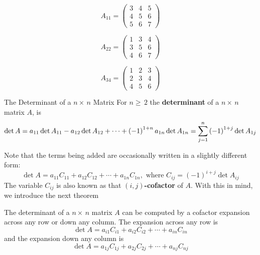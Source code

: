 \begin{minipage}{0.3\linewidth}
    \[
        A_{11} = \begin{pmatrix}
            3 & 4 & 5 \\
            4 & 5 & 6 \\
            5 & 6 & 7
        \end{pmatrix}
    \]    
\end{minipage}
\hfill
\begin{minipage}{0.3\linewidth}
    \[
        A_{22} = \begin{pmatrix}
            1 & 3 & 4 \\
            3 & 5 & 6 \\
            4 & 6 & 7
        \end{pmatrix}
    \]
\end{minipage}
\hfill
\begin{minipage}{0.3\linewidth}
   \[
        A_{34} = \begin{pmatrix}
            1 & 2 & 3 \\
            2 & 3 & 4 \\
            4 & 5 & 6
        \end{pmatrix}
   \] 
\end{minipage}

\begin{defbox}{The Determinant of a $n\times\,n$ Matrix}{}
    For $n\geq\,2$ the \textbf{determinant} of a $n\times\,n$ matrix $A$, is 
    \[\det{A} = a_{11}\det{A_{11}} - a_{12}\det{A_{12}} + \cdots + \left(-1\right)^{1+n}a_{1n}\det{A_{1n}} \\ = \sum_{j=1}^{n} \left(-1\right)^{1+j}\det{A_{1j}}\]
\end{defbox}

Note that the terms being added are occasionally written in a slightly different form: 
\[
    \det{A} = a_{11}C_{11} + a_{12}C_{12} + \cdots + a_{1n}C_{1n}, \text{ where } C_{ij} = \left(-1\right)^{i+j}\det{A_{ij}}
\]
The variable $C_{ij}$ is also known as that \textbf{$(i, j)$-cofactor} of $A$. With this in mind, we introduce the next theorem

\begin{thm}{}{}
    The determinant of a $n\times\,n$ matrix $A$ can be computed by a cofactor expansion across any row or down any column. The expansion across any row is 
    \[\det{A} = a_{i1}C_{i1} + a_{i2}C_{i2} + \cdots + a_{in}C_{in}\]
    and the expansion down any column is
    \[\det{A} = a_{1j}C_{1j} + a_{2j}C_{2j} + \cdots + a_{nj}C_{nj}\]
\end{thm}

